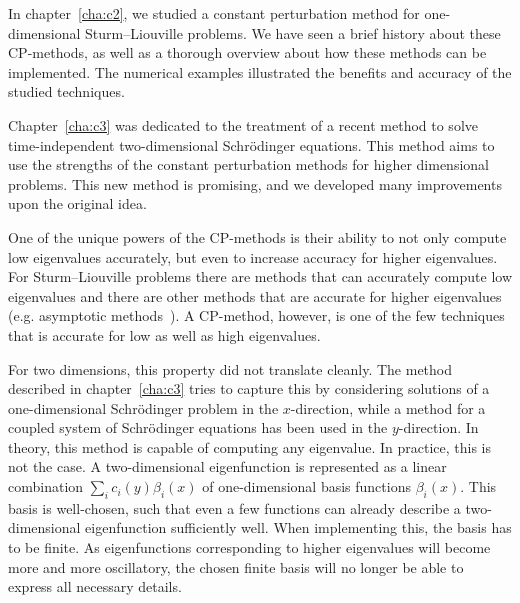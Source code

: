 

\label{cha:c4}

In chapter~\ref{cha:c2}, we studied a constant perturbation method for one-dimensional Sturm--Liouville problems. We have seen a brief history about these CP-methods, as well as a thorough overview about how these methods can be implemented. The numerical examples illustrated the benefits and accuracy of the studied techniques.

Chapter~\ref{cha:c3} was dedicated to the treatment of a recent method to solve time-independent two-dimensional Schrödinger equations. This method aims to use the strengths of the constant perturbation methods for higher dimensional problems. This new method is promising, and we developed many improvements upon the original idea.

One of the unique powers of the CP-methods is their ability to not only compute low eigenvalues accurately, but even to increase accuracy for higher eigenvalues. For Sturm--Liouville problems there are methods that can accurately compute low eigenvalues and there are other methods that are accurate for higher eigenvalues (e.g. asymptotic methods~\cite{kuzmina_asymptotic_2000,zhukova_asymptotic_2020}). A CP-method, however, is one of the few techniques that is accurate for low as well as high eigenvalues.

For two dimensions, this property did not translate cleanly. The method described in chapter~\ref{cha:c3} tries to capture this by considering solutions of a one-dimensional Schrödinger problem in the $x$-direction, while a method for a coupled system of Schrödinger equations has been used in the $y$-direction. In theory, this method is capable of computing any eigenvalue. In practice, this is not the case. A two-dimensional eigenfunction is represented as a linear combination $\sum_{i} c_i(y) \beta_i(x)$ of one-dimensional basis functions $\beta_i(x)$. This basis is well-chosen, such that even a few functions can already describe a two-dimensional eigenfunction sufficiently well. When implementing this, the basis has to be finite. As eigenfunctions corresponding to higher eigenvalues will become more and more oscillatory, the chosen finite basis will no longer be able to express all necessary details.

